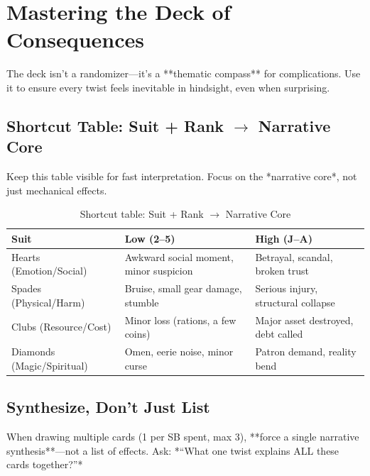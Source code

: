 \section{Mastering the Deck of Consequences}

The deck isn't a randomizer---it's a **thematic compass** for complications. Use it to ensure every twist feels inevitable in hindsight, even when surprising.

\subsection*{Shortcut Table: Suit + Rank $\rightarrow$ Narrative Core}
\label{subsec:deck-shortcut}
Keep this table visible for fast interpretation. Focus on the *narrative core*, not just mechanical effects.

\begin{table}[htbp]
\centering
\small
\begin{tabularx}{\textwidth}{lXX}
\toprule
\textbf{Suit} & \textbf{Low (2--5)} & \textbf{High (J--A)} \\
\midrule
Hearts (Emotion/Social) & Awkward social moment, minor suspicion & Betrayal, scandal, broken trust \\
Spades (Physical/Harm) & Bruise, small gear damage, stumble & Serious injury, structural collapse \\
Clubs (Resource/Cost) & Minor loss (rations, a few coins) & Major asset destroyed, debt called \\
Diamonds (Magic/Spiritual) & Omen, eerie noise, minor curse & Patron demand, reality bend \\
\bottomrule
\end{tabularx}
\caption{Shortcut table: Suit + Rank $\rightarrow$ Narrative Core}
\label{tab:deck-shortcut}
\end{table}

\subsection*{Synthesize, Don't Just List}
When drawing multiple cards (1 per SB spent, max 3), **force a single narrative synthesis**---not a list of effects. Ask: *``What one twist explains ALL these cards together?''*

